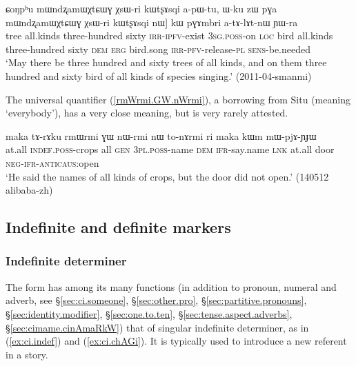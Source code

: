 \begin{exe}
\ex \label{ex:mWndzxamWXtCWG.kW}
\gll  ɕoŋpʰu mɯndʐamɯχtɕɯɣ χsɯ-ri kɯtʂɤsqi a-pɯ-tu, ɯ-ku zɯ pɣa mɯndʐamɯχtɕɯɣ χsɯ-ri kɯtʂɤsqi nɯ] kɯ pɣɤmbri a-tɤ-lɤt-nɯ ɲɯ-ra \\
tree all.kinds three-hundred sixty \textsc{irr}-\textsc{ipfv}-exist \textsc{3sg}.\textsc{poss}-on \textsc{loc} bird all.kinds three-hundred sixty \textsc{dem} \textsc{erg} bird.song \textsc{irr}-\textsc{pfv}-release-\textsc{pl} \textsc{sens}-be.needed \\
\glt `May there be three hundred and sixty trees of all kinds, and on them three hundred and sixty bird of all kinds of species singing.' (2011-04-smanmi)
\end{exe}

The universal quantifier  (\ref{rmWrmi.GW.nWrmi}), a borrowing from Situ (meaning `everybody'), has a very close meaning, but is very rarely attested.
  
\begin{exe}
\ex \label{rmWrmi.GW.nWrmi}
\gll  maka tɤ-rɤku rmɯrmi ɣɯ nɯ-rmi nɯ to-nɤrmi ri maka kɯm mɯ-pjɤ-ɲɟɯ   \\
at.all \textsc{indef}.\textsc{poss}-crops all \textsc{gen} \textsc{3pl}.\textsc{poss}-name \textsc{dem} \textsc{ifr}-say.name \textsc{lnk} at.all door \textsc{neg}-\textsc{ifr}-\textsc{anticaus}:open \\
\glt `He said the names of all kinds of crops, but the door did not open.' (140512 alibaba-zh)
\end{exe}  

\subsection{Indefinite and definite markers} \label{sec:indefinite.markers}

\subsubsection{Indefinite determiner} \label{sec:indef.article}
The form  has among its many functions (in addition to pronoun, numeral and adverb, see §\ref{sec:ci.someone}, §\ref{sec:other.pro}, §\ref{sec:partitive.pronouns}, §\ref{sec:identity.modifier}, §\ref{sec:one.to.ten}, §\ref{sec:tense.aspect.adverbs}, §\ref{sec:cimame.cinAmaRkW}) that of singular indefinite determiner, as in (\ref{ex:ci.indef}) and (\ref{ex:ci.chAGi}). It is typically used to introduce a new referent in a story.


